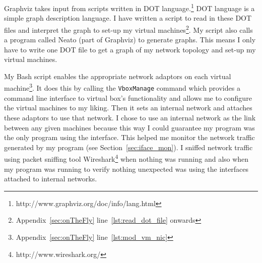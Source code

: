 \documentclass[12pt]{article}
\begin{document}
Graphviz takes input from scripts written in DOT language.\footnote{
http://www.graphviz.org/doc/info/lang.html} DOT language is a simple
graph description language.
I have written a script to read in these DOT files and interpret
the graph to set-up my virtual machines\footnote{Appendix~\ref{sec:onTheFly}
 line~\ref{lst:read_dot_file} onwards}.
My script also calls a program called Neato (part of Graphviz) to generate graphs.
This means I only have to write one DOT file to get a graph of
my network topology and set-up my virtual machines.

My Bash script enables the appropriate network adaptors on
each virtual machine\footnote{Appendix~\ref{sec:onTheFly} line~\ref{lst:mod_vm_nic}}.
It does this by calling the \texttt{VboxManage} command which provides
a command line interface to virtual box's functionality and allows
me to configure the virtual machines to my liking.
Then it sets an internal network and attaches these adaptors to use that
network. 
I chose to use an internal network
as the link between any given machines because this way I could
guarantee my program
was the only program using the interface.
This helped me monitor the network traffic generated by
my program (see Section~\ref{sec:iface_mon}).
I sniffed network traffic using packet sniffing tool
Wireshark\footnote{http://www.wireshark.org/}
when nothing was running and also when my program was running
to verify nothing unexpected was using the interfaces attached to
internal networks.

\end{document}
